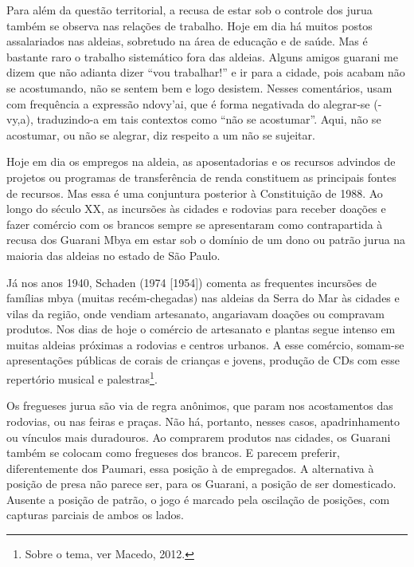\documentclass{article}
\begin{document}
Para al\'em da quest\~ao territorial, a recusa de estar sob o controle
dos jurua tamb\'em se observa nas rela\c{c}\~oes de trabalho. Hoje em
dia h\'a muitos postos assalariados nas aldeias, sobretudo na \'area de
educa\c{c}\~ao e de sa\'ude. Mas \'e bastante raro o trabalho
sistem\'atico fora das aldeias. Alguns amigos guarani me dizem que
n\~ao adianta dizer {\textquotedblleft}vou
trabalhar!{\textquotedblright} e ir para a cidade, pois acabam n\~ao se
acostumando, n\~ao se sentem bem e logo desistem. Nesses coment\'arios,
usam com frequ\^encia a express\~ao ndovy{\textquoteright}ai, que \'e
forma negativada do alegrar-se (-vy,a), traduzindo-a em tais contextos
como {\textquotedblleft}n\~ao se acostumar{\textquotedblright}. Aqui,
n\~ao se acostumar, ou n\~ao se alegrar, diz respeito a um n\~ao se
sujeitar.

Hoje em dia os empregos na aldeia, as aposentadorias e os recursos
advindos de projetos ou programas de transfer\^encia de renda
constituem as principais fontes de recursos. Mas essa \'e uma
conjuntura posterior \`a Constitui\c{c}\~ao de 1988. Ao longo do
s\'eculo XX, as incurs\~oes \`as cidades e rodovias para receber
doa\c{c}\~oes e fazer com\'ercio com os brancos sempre se apresentaram
como contrapartida \`a recusa dos Guarani Mbya em estar sob o dom\'inio
de um dono ou patr\~ao jurua na maioria das aldeias no estado de S\~ao
Paulo. 

J\'a nos anos 1940, Schaden (1974 [1954]) comenta as frequentes
incurs\~oes de fam\'ilias mbya (muitas rec\'em-chegadas) nas aldeias da
Serra do Mar \`as cidades e vilas da regi\~ao, onde vendiam artesanato,
angariavam doa\c{c}\~oes ou compravam produtos. Nos dias de hoje o
com\'ercio de artesanato e plantas segue intenso em muitas aldeias
pr\'oximas a rodovias e centros urbanos. A esse com\'ercio, somam-se
apresenta\c{c}\~oes p\'ublicas de corais de crian\c{c}as e jovens,
produ\c{c}\~ao de CDs com esse repert\'orio musical e
palestras\footnote{ Sobre o tema, ver Macedo, 2012.}. 

Os fregueses jurua s\~ao via de regra an\^onimos, que param nos
acostamentos das rodovias, ou nas feiras e pra\c{c}as. N\~ao h\'a,
portanto, nesses casos, apadrinhamento ou v\'inculos mais duradouros.
Ao comprarem produtos nas cidades, os Guarani tamb\'em se colocam como
fregueses dos brancos. E parecem preferir, diferentemente dos Paumari,
essa posi\c{c}\~ao \`a de empregados. A alternativa \`a posi\c{c}\~ao
de presa n\~ao parece ser, para os Guarani, a posi\c{c}\~ao de ser
domesticado. Ausente a posi\c{c}\~ao de patr\~ao, o jogo \'e marcado
pela oscila\c{c}\~ao de posi\c{c}\~oes, com capturas parciais de ambos
os lados.
\end{document}
